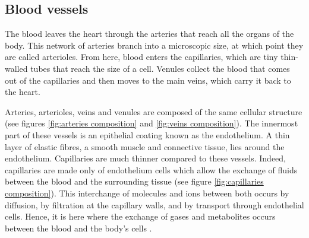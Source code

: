 \subsection{Blood vessels}
The blood leaves the heart through the arteries that reach all the organs of the body. This network of arteries branch into a microscopic size, at which point they are called arterioles. From here, blood enters the capillaries, which are tiny thin-walled tubes that reach the size of a cell. Venules collect the blood that comes out of the capillaries and then moves to the main veins, which carry it back to the heart.

Arteries, arterioles, veins and venules are composed of the same cellular structure (see figures \ref{fig:arteries composition} and \ref{fig:veins composition}). The innermost part of these vessels is an epithelial coating known as the endothelium. A thin layer of elastic fibres, a smooth muscle and connective tissue, lies around the endothelium. Capillaries are much thinner compared to these vessels. Indeed, capillaries are made only of endothelium cells which allow the exchange of fluids between the blood and the surrounding tissue (see figure \ref{fig:capillaries composition}). This interchange of molecules and ions between both occurs by diffusion, by filtration at the capillary walls, and by transport through endothelial cells. Hence, it is here where the exchange of gases and metabolites occurs between the blood and the body's cells \cite{johnson2001biology}.

